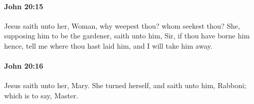 		\paragraph{John 20:15} %
			\label{JOHN-20-15}

			Jesus saith unto her, Woman, why weepest thou? whom seekest thou? She, supposing him to be the gardener, saith unto him, Sir, if thou have borne him hence, tell me where thou hast laid him, and I will take him away.

			\begin{framed}
				\scriptsize
				\begin{compactdesc}
					\item[SBLG] 
				\end{compactdesc}
			\end{framed}

		\paragraph{John 20:16} %
			\label{JOHN-20-16}

			Jesus saith unto her, Mary. She turned herself, and saith unto him, Rabboni; which is to say, Master.

